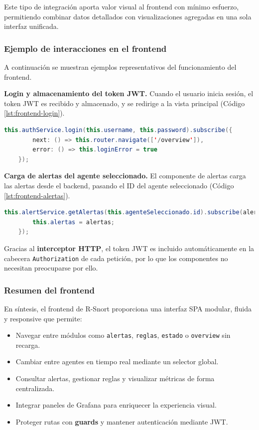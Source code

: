 \documentclass[11pt,a4paper,twoside]{report}
\begin{document}
Este tipo de integración aporta valor visual al frontend con mínimo esfuerzo, permitiendo combinar datos detallados con visualizaciones agregadas en una sola interfaz unificada.

\subsubsection{Ejemplo de interacciones en el frontend}

A continuación se muestran ejemplos representativos del funcionamiento del frontend.\newline

\textbf{Login y almacenamiento del token JWT.} Cuando el usuario inicia sesión, el token JWT es recibido y almacenado, y se redirige a la vista principal (Código \ref{lst:frontend-login}).

\begin{lstlisting}[language=Java, caption={Login y navegación tras autenticación.}, label={lst:frontend-login}]
	this.authService.login(this.username, this.password).subscribe({
		next: () => this.router.navigate(['/overview']),
		error: () => this.loginError = true
	});
\end{lstlisting}

\textbf{Carga de alertas del agente seleccionado.} El componente de alertas carga las alertas desde el backend, pasando el ID del agente seleccionado (Código \ref{lst:frontend-alertas}).

\begin{lstlisting}[language=Java, caption={Carga de alertas desde el servicio.}, label={lst:frontend-alertas}]
	this.alertService.getAlertas(this.agenteSeleccionado.id).subscribe(alertas => {
		this.alertas = alertas;
	});
\end{lstlisting}

Gracias al \textbf{interceptor HTTP}, el token JWT es incluido automáticamente en la cabecera \texttt{Authorization} de cada petición, por lo que los componentes no necesitan preocuparse por ello.

\subsubsection{Resumen del frontend}

En síntesis, el frontend de R-Snort proporciona una interfaz SPA modular, fluida y responsive que permite:

\begin{itemize}
	\item Navegar entre módulos como \texttt{alertas}, \texttt{reglas}, \texttt{estado} o \texttt{overview} sin recarga.
	\item Cambiar entre agentes en tiempo real mediante un selector global.
	\item Consultar alertas, gestionar reglas y visualizar métricas de forma centralizada.
	\item Integrar paneles de Grafana para enriquecer la experiencia visual.
	\item Proteger rutas con \textbf{guards} y mantener autenticación mediante JWT.
\end{itemize}
\end{document}
